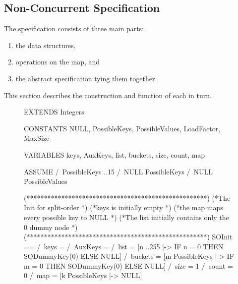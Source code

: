 \documentclass{uit-thesis}
\begin{document}
\subsection{Non-Concurrent Specification}\label{subsec:non-concurrent}
The specification consists of three main parts:
\begin{enumerate}
    \item \label{SpecList:structures} the data structures,
    \item \label{SpecList:operations} operations on the map, and
    \item \label{SpecList:spec} the abstract specification tying them together.
\end{enumerate}
This section describes the construction and function of each in turn.
\begin{figure}
    \begin{tla}
EXTENDS Integers

CONSTANTS NULL, PossibleKeys, PossibleValues, LoadFactor, MaxSize

VARIABLES keys, AuxKeys, list, buckets, size, count, map

ASSUME
    /\ PossibleKeys ..15
    /\ NULL \notin PossibleKeys
    /\ NULL \notin PossibleValues

(****************************************************)
(*The Init for split-order                          *)
(*keys is initially empty                           *)
(*the map maps every possible key to NULL           *)
(*The list initially contains only the 0 dummy node *)
(****************************************************)
SOInit ==   /\ keys = {}
            /\ AuxKeys = {}
            /\ list = [n ..255 |-> IF n = 0 THEN SODummyKey(0) ELSE NULL]
            /\ buckets = [m \in PossibleKeys |-> IF m = 0 THEN SODummyKey(0) ELSE NULL]
            /\ size = 1
            /\ count = 0
            /\ map = [k \in PossibleKeys |-> NULL]


\end{tla}
\end{figure}
\end{document}
